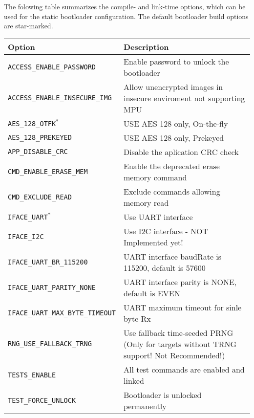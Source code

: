   The folowing table summarizes the compile- and link-time options, which can be used for the static bootloader configuration.
  The default bootloader build options are star-marked.

  \begin{table*}[!ht]
    \hspace*{-4cm}
    \begin{tabular}{| p{5.5cm} | p{7.5cm} |}
        \hline
        \rowcolor{SeaGreen3!30!} {\bf Option} & {\bf Description} \\
        \hline
        \hline
        \texttt{ACCESS\_ENABLE\_PASSWORD} & Enable password to unlock the bootloader \\
        \hline
        \texttt{ACCESS\_ENABLE\_INSECURE\_IMG} & Allow unencrypted images in insecure enviroment not supporting MPU\footnotemark \\
        \hline
        \texttt{AES\_128\_OTFK$^*$} & USE AES 128 only, On-the-fly \\
        \hline
        \texttt{AES\_128\_PREKEYED} & USE AES 128 only, Prekeyed \\
        \hline
        \texttt{APP\_DISABLE\_CRC} & Disable the aplication CRC check \\
        \hline
        \texttt{CMD\_ENABLE\_ERASE\_MEM} & Enable the deprecated erase memory command \\
        \hline
        \texttt{CMD\_EXCLUDE\_READ} & Exclude commands allowing memory read \\
        \hline
        \texttt{IFACE\_UART$^*$} & Use UART interface\\
        \hline
        \texttt{IFACE\_I2C} & Use I2C interface - NOT Implemented yet!\\
        \hline
        \texttt{IFACE\_UART\_BR\_115200} & UART interface baudRate is 115200, default is 57600\\
        \hline
        \texttt{IFACE\_UART\_PARITY\_NONE} & UART interface parity is NONE, default is EVEN\\
        \hline
        \texttt{IFACE\_UART\_MAX\_BYTE\_TIMEOUT} & UART maximum timeout for sinle byte Rx\\
        \hline
        \texttt{RNG\_USE\_FALLBACK\_TRNG} & Use fallback time-seeded PRNG (Only for targets without TRNG support! Not Recommended!) \\
        \hline
        \texttt{TESTS\_ENABLE} & All test commands are enabled and linked\\
        \hline
        \texttt{TEST\_FORCE\_UNLOCK} & Bootloader is unlocked permanently \\
        \hline
    \end{tabular}
    \label{tab:cmdset}
   \end{table*}
   
